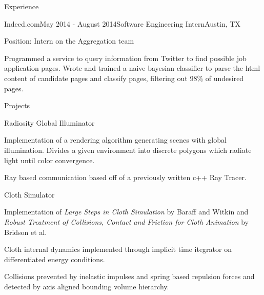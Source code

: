 \documentclass{resume} %
\begin{document}
\begin{rSection}{Experience}

\begin{rSubsection}{Indeed.com}{May 2014 - August 2014}{Software Engineering Intern}{Austin, TX}
\item Position: Intern on the Aggregation team
\item Programmed a service to query information from Twitter to find possible job application pages. Wrote and trained a naive bayesian classifier to parse the html content of candidate pages and classify pages, filtering out 98\% of undesired pages. 
\end{rSubsection}

\end{rSection}

\begin{rSection}{Projects}

  \begin{rSubsection}{Radiosity Global Illuminator}{}{}{}
  \item Implementation of a rendering algorithm generating scenes with global illumination. Divides a given environment into discrete polygons which radiate light until color convergence. 
  \item Ray based communication based off of a previously written c++ Ray Tracer.
  \end{rSubsection}

  \begin{rSubsection}{Cloth Simulator}{}{}{}
  \item Implementation of \textit{Large Steps in Cloth Simulation} by Baraff and Witkin and \textit{Robust Treatment of Collisions, Contact and Friction for Cloth Animation} by Bridson et al. 
  \item Cloth internal dynamics implemented through implicit time itegrator on differentiated energy conditions. 
  \item Collisions prevented by inelastic impulses and spring based repulsion forces and detected by axis aligned bounding volume hierarchy.
  \end{rSubsection}

\end{rSection}
\end{document}
